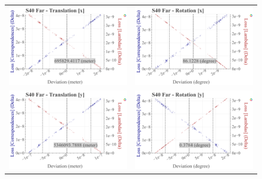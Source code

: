 \begin{figure}[t]
  \centering
  \begin{tabular}{cc}
    \includegraphics[width=0.45 \linewidth]{diagrams/calibration/s40_n_far/parameters.csv/Translation[x]_vs_Loss[Correspondences]_vs_Loss[Lambdas]_cluster_All.png} &
    \includegraphics[width=0.45 \linewidth]{diagrams/calibration/s40_n_far/parameters.csv/Rotation[x]_vs_Loss[Correspondences]_vs_Loss[Lambdas]_cluster_All.png} \\
    
    \includegraphics[width=0.45 \linewidth]{diagrams/calibration/s40_n_far/parameters.csv/Translation[y]_vs_Loss[Correspondences]_vs_Loss[Lambdas]_cluster_All.png} &
    \includegraphics[width=0.45 \linewidth]{diagrams/calibration/s40_n_far/parameters.csv/Rotation[y]_vs_Loss[Correspondences]_vs_Loss[Lambdas]_cluster_All.png} \\
    

\end{tabular}
\end{figure}
